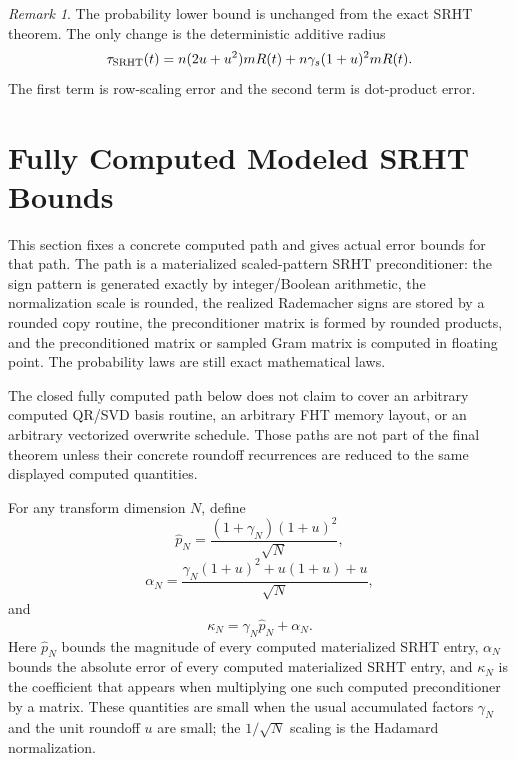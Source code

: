 \documentclass[11pt]{article}
\theoremstyle{remark}
\newtheorem*{remark}{Remark}
\begin{document}
\begin{remark}
The probability lower bound is unchanged from the exact SRHT theorem.  The only
change is the deterministic additive radius
\[
  \tau_{\rm SRHT}(t)
  =
  n(2u+u^2)mR(t)
  +
  n\gamma_s(1+u)^2mR(t).
\]
The first term is row-scaling error and the second term is dot-product error.
\end{remark}

\section*{Fully Computed Modeled SRHT Bounds}

This section fixes a concrete computed path and gives actual error bounds for
that path.  The path is a materialized scaled-pattern SRHT preconditioner:
the sign pattern is generated exactly by integer/Boolean arithmetic, the
normalization scale is rounded, the realized Rademacher signs are stored by a
rounded copy routine, the preconditioner matrix is formed by rounded products,
and the preconditioned matrix or sampled Gram matrix is computed in floating
point.  The probability laws are still exact mathematical laws.

The closed fully computed path below does not claim to cover an arbitrary
computed QR/SVD basis routine, an arbitrary FHT memory layout, or an arbitrary
vectorized overwrite schedule.  Those paths are not part of the final theorem
unless their concrete roundoff recurrences are reduced to the same displayed
computed quantities.

For any transform dimension \(N\), define
\[
  \widehat p_N
  =
  \frac{(1+\gamma_N)(1+u)^2}{\sqrt N},
\]
\[
  \alpha_N
  =
  \frac{\gamma_N(1+u)^2+u(1+u)+u}{\sqrt N},
\]
and
\[
  \kappa_N=\gamma_N\widehat p_N+\alpha_N .
\]
Here \(\widehat p_N\) bounds the magnitude of every computed materialized SRHT
entry, \(\alpha_N\) bounds the absolute error of every computed materialized
SRHT entry, and \(\kappa_N\) is the coefficient that appears when multiplying
one such computed preconditioner by a matrix.  These quantities are small when
the usual accumulated factors \(\gamma_N\) and the unit roundoff \(u\) are
small; the \(1/\sqrt N\) scaling is the Hadamard normalization.
\end{document}
